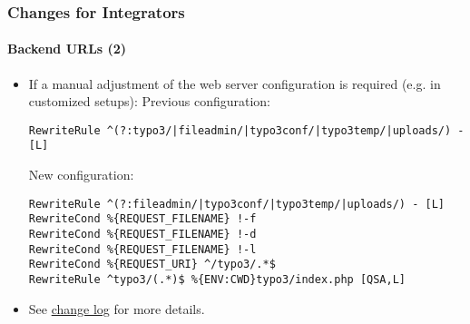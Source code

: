 %

\begin{frame}[fragile]
	\frametitle{Changes for Integrators}
	\framesubtitle{Backend URLs (2)}


	\begin{itemize}
		\item If a manual adjustment of the web server configuration is required
			(e.g. in customized setups):\newline
		\smaller
			Previous configuration:
		\normalsize
\begin{lstlisting}
RewriteRule ^(?:typo3/|fileadmin/|typo3conf/|typo3temp/|uploads/) - [L]
\end{lstlisting}

		\smaller
			New configuration:
		\normalsize
\begin{lstlisting}
RewriteRule ^(?:fileadmin/|typo3conf/|typo3temp/|uploads/) - [L]
RewriteCond %{REQUEST_FILENAME} !-f
RewriteCond %{REQUEST_FILENAME} !-d
RewriteCond %{REQUEST_FILENAME} !-l
RewriteCond %{REQUEST_URI} ^/typo3/.*$
RewriteRule ^typo3/(.*)$ %{ENV:CWD}typo3/index.php [QSA,L]
\end{lstlisting}

		\item See \href{https://docs.typo3.org/c/typo3/cms-core/master/en-us/Changelog/11.0/Breaking-93048-BackendURLRewrites.html}{change log}
			for more details.

	\end{itemize}
\end{frame}

